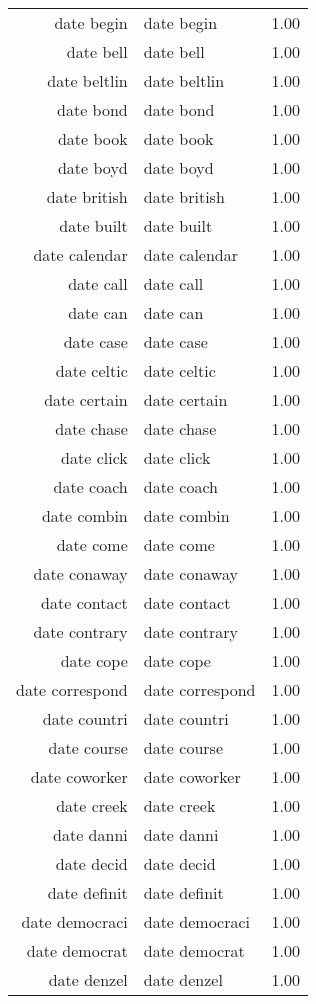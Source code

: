 \begin{table}[ht]
\begin{tabular}{rlr}
  date begin & date begin & 1.00 \\ 
  date bell & date bell & 1.00 \\ 
  date beltlin & date beltlin & 1.00 \\ 
  date bond & date bond & 1.00 \\ 
  date book & date book & 1.00 \\ 
  date boyd & date boyd & 1.00 \\ 
  date british & date british & 1.00 \\ 
  date built & date built & 1.00 \\ 
  date calendar & date calendar & 1.00 \\ 
  date call & date call & 1.00 \\ 
  date can & date can & 1.00 \\ 
  date case & date case & 1.00 \\ 
  date celtic & date celtic & 1.00 \\ 
  date certain & date certain & 1.00 \\ 
  date chase & date chase & 1.00 \\ 
  date click & date click & 1.00 \\ 
  date coach & date coach & 1.00 \\ 
  date combin & date combin & 1.00 \\ 
  date come & date come & 1.00 \\ 
  date conaway & date conaway & 1.00 \\ 
  date contact & date contact & 1.00 \\ 
  date contrary & date contrary & 1.00 \\ 
  date cope & date cope & 1.00 \\ 
  date correspond & date correspond & 1.00 \\ 
  date countri & date countri & 1.00 \\ 
  date course & date course & 1.00 \\ 
  date coworker & date coworker & 1.00 \\ 
  date creek & date creek & 1.00 \\ 
  date danni & date danni & 1.00 \\ 
  date decid & date decid & 1.00 \\ 
  date definit & date definit & 1.00 \\ 
  date democraci & date democraci & 1.00 \\ 
  date democrat & date democrat & 1.00 \\ 
  date denzel & date denzel & 1.00 \\ 

\end{tabular}
\end{table}
